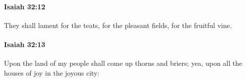 		\paragraph{Isaiah 32:12} %
			\label{ISAIAH-32-12}

			They shall lament for the teats, for the pleasant fields, for the fruitful vine.


		\paragraph{Isaiah 32:13} %
			\label{ISAIAH-32-13}

			Upon the land of my people shall come up thorns and briers; yea, upon all the houses of joy in the joyous city:


